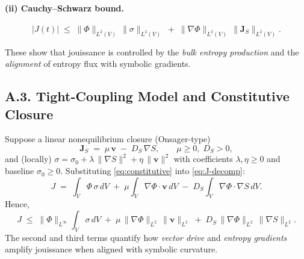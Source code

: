 \documentclass[12pt,a4paper]{article}
\begin{document}
\paragraph{(ii) Cauchy–Schwarz bound.}
\begin{equation}
\label{eq:CS-bound}
|J(t)| \;\le\; \|\Phi\|_{L^2(V)}\,\|\sigma\|_{L^2(V)} \;+\; \|\nabla\Phi\|_{L^2(V)}\,\|\mathbf{J}_S\|_{L^2(V)}.
\end{equation}

These show that jouissance is controlled by the \emph{bulk entropy production} and the \emph{alignment} of entropy flux with symbolic gradients.

\subsection*{A.3. Tight-Coupling Model and Constitutive Closure}
Suppose a linear nonequilibrium closure (Onsager-type)
\begin{equation}
\label{eq:constitutive}
\mathbf{J}_S \;=\; \mu\,\mathbf{v} \;-\; D_S\,\nabla S,
\qquad \mu\ge 0,\; D_S>0,
\end{equation}
and (locally) $\sigma = \sigma_0 + \lambda\,\|\nabla S\|^2 + \eta\,\|\mathbf{v}\|^2$ with coefficients $\lambda,\eta\ge 0$ and baseline $\sigma_0\ge 0$. Substituting \eqref{eq:constitutive} into \eqref{eq:J-decomp}:
\begin{equation}
\label{eq:J-constituted}
J \;=\; \int_V \Phi\,\sigma\,dV \;+\; \mu\int_V \nabla\Phi\cdot \mathbf{v}\,dV \;-\; D_S\int_V \nabla\Phi\cdot\nabla S\,dV.
\end{equation}
Hence,
\begin{equation}
\label{eq:J-upper}
J \;\le\; \|\Phi\|_{L^\infty}\!\int_V \sigma\,dV \;+\; \mu\,\|\nabla\Phi\|_{L^2}\,\|\mathbf{v}\|_{L^2}
\;+\; D_S\,\|\nabla\Phi\|_{L^2}\,\|\nabla S\|_{L^2}.
\end{equation}
The second and third terms quantify how \emph{vector drive} and \emph{entropy gradients} amplify jouissance when aligned with symbolic curvature.
\end{document}
